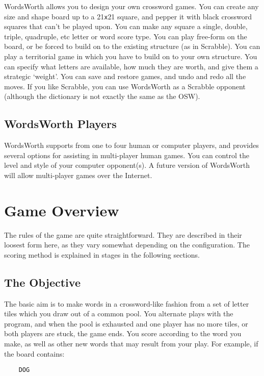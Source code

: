 WordsWorth allows you to design your own crossword games.  You can
create any size and shape board up to a 21{\tt x}21 square, and
pepper it with black crossword squares that can't be played upon.
You can make any square a single, double, triple, quadruple, etc
letter or word score type. You can play free-form on the board, or be
forced to build on to the existing structure (as in Scrabble). You
can play a territorial game in which you have to build on to your own
structure. You can specify what letters are available, how much they
are worth, and give them a strategic `weight'. You can save and
restore games, and undo and redo all the moves.  If you like
Scrabble, you can use WordsWorth as a Scrabble opponent (although the
dictionary is not exactly the same as the OSW).

\subsection{WordsWorth Players}

WordsWorth supports from one to four human or computer players, and
provides several options for assisting in multi-player human games.
You can control the level and style of your computer opponent(s).  A
future version of WordsWorth will allow multi-player games over the
Internet.

\section{Game Overview}

The rules of the game are quite straightforward. They are described
in their loosest form here, as they vary somewhat depending on the
configuration. The scoring method is explained in stages in the
following sections.

\subsection{The Objective}

The basic aim is to make words in a crossword-like fashion from a
set of letter tiles which you draw out of a common pool. You 
alternate plays with the program, and when the pool is exhausted 
and one player has no more tiles, or both players are stuck, the
game ends. You score according to the word you make, as well as 
other new words that may result from your play. For example, if
the board contains:

\begin{verbatim}
    DOG
\end{verbatim}


